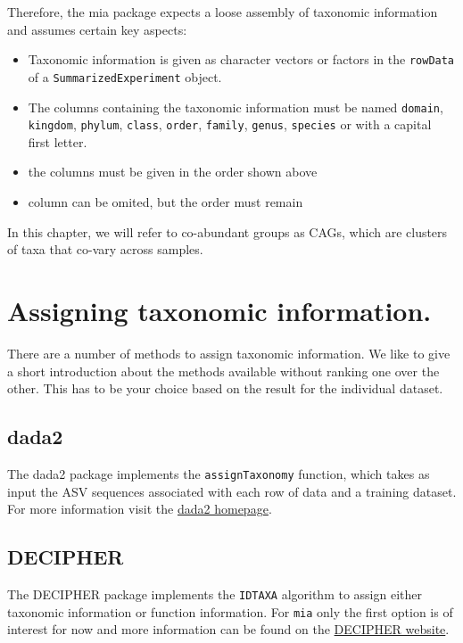 \documentclass[
]{book}
\providecommand{\tightlist}{%
  \setlength{\itemsep}{0pt}\setlength{\parskip}{0pt}}
\begin{document}
Therefore, the mia package expects a loose assembly of taxonomic information
and assumes certain key aspects:

\begin{itemize}
\tightlist
\item
  Taxonomic information is given as character vectors or factors in the
  \texttt{rowData} of a \texttt{SummarizedExperiment} object.
\item
  The columns containing the taxonomic information must be named \texttt{domain},
  \texttt{kingdom}, \texttt{phylum}, \texttt{class}, \texttt{order}, \texttt{family}, \texttt{genus}, \texttt{species} or with
  a capital first letter.
\item
  the columns must be given in the order shown above
\item
  column can be omited, but the order must remain
\end{itemize}

In this chapter, we will refer to co-abundant groups as CAGs, which are
clusters of taxa that co-vary across samples.

\hypertarget{assigning-taxonomic-information.}{%
\section{Assigning taxonomic information.}\label{assigning-taxonomic-information.}}

There are a number of methods to assign taxonomic information. We like to give
a short introduction about the methods available without ranking one over the
other. This has to be your choice based on the result for the individual
dataset.

\hypertarget{dada2}{%
\subsection{dada2}\label{dada2}}

The dada2 package \citep{Callahan2016dada2} implements the \texttt{assignTaxonomy}
function, which takes as input the ASV sequences associated with each
row of data and a training dataset. For more information visit the
\href{https://benjjneb.github.io/dada2/assign.html}{dada2 homepage}.

\hypertarget{decipher}{%
\subsection{DECIPHER}\label{decipher}}

The DECIPHER package \citep{R_DECIPHER} implements the \texttt{IDTAXA} algorithm to assign
either taxonomic information or function information. For \texttt{mia}
only the first option is of interest for now and more information can be
found on the \href{http://www2.decipher.codes/Classification.html}{DECIPHER website}.
\end{document}
